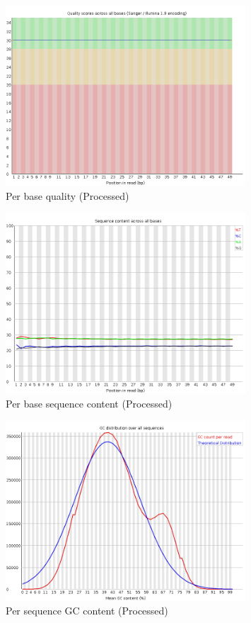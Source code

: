 \documentclass[UTF8]{ctexart}
\begin{document}
\begin{figure}[!htb]
	\centering
	\includegraphics[width=0.8\textwidth]{img/SRR14325859_FastQC_Processed_img/per_base_quality.png}	%
	\caption{Per base quality (Processed)\protect}    %
\end{figure}

\begin{figure}[!htb]
	\centering
	\includegraphics[width=0.8\textwidth]{img/SRR14325859_FastQC_Processed_img/per_base_sequence_content.png}	%
	\caption{Per base sequence content (Processed)\protect}    %
\end{figure}

\clearpage

\begin{figure}[!htb]
	\centering
	\includegraphics[width=0.8\textwidth]{img/SRR14325859_FastQC_Processed_img/per_sequence_gc_content.png}	%
	\caption{Per sequence GC content (Processed)\protect}    %
\end{figure}
\end{document}
